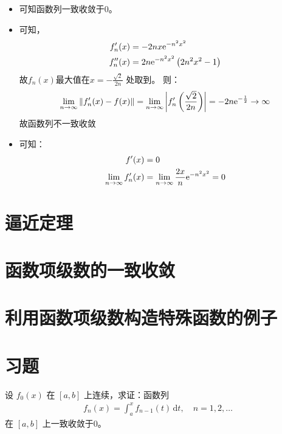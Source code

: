 \begin{solution}
    \begin{itemize}
        \item 可知函数列一致收敛于\(0\)。
        \item 可知，
            \begin{align*}
                f_{n}'(x)  & = -2nx\mathrm{e}^{-n^{2}x^{2}}     \\
                f_{n}''(x) & = 2n\mathrm{e}^{-n^{2}x^{2}}\left(
                2n^{2}x^{2} - 1\right)
            \end{align*}
            故\(f_{n}(x)\)最大值在\(x = -\frac{\sqrt{2}}{2n}\) 处取到。
            则： \[
                \lim_{n \to \infty} \left\lVert f_{n}'(x) - f(x)
                \right\rVert = \lim_{n \to \infty} \left|
                f'_{n}\left(\frac{\sqrt{2}}{2n}\right) \right| =
                -2n\mathrm{e}^{-\frac{1}{2}} \to \infty
            \]
            故函数列不一致收敛
        \item 可知：
            \begin{align*}
                f'(x)                         & = 0
                \\
                \lim_{n \to \infty} f'_{n}(x) & = \lim_{n \to \infty}
                \frac{2x}{n}\mathrm{e}^{-n^{2}x^{2}} = 0
            \end{align*}
    \end{itemize}
\end{solution}
\section{逼近定理}
\section{函数项级数的一致收敛}
\section{利用函数项级数构造特殊函数的例子}
\section{习题}

\begin{problem}
    设 \(f_0(x)\) 在 \([a, b]\) 上连续，求证：函数列
    \begin{align*}
        f_n(x) = \int_a^x f_{n-1}(t) \, \mathrm{d}t, \quad
        n = 1, 2, \dots
    \end{align*}
    在 \([a, b]\) 上一致收敛于0。
\end{problem}

